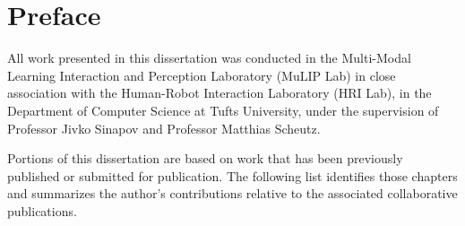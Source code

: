 \chapter*{Preface}

All work presented in this dissertation was conducted in the Multi-Modal Learning Interaction and Perception Laboratory (MuLIP Lab) in close association with the Human-Robot Interaction Laboratory (HRI Lab), in the Department of Computer Science at Tufts University, under the supervision of Professor Jivko Sinapov and Professor Matthias Scheutz.

Portions of this dissertation are based on work that has been previously published or submitted for publication. The following list identifies those chapters and summarizes the author's contributions relative to the associated collaborative publications.

